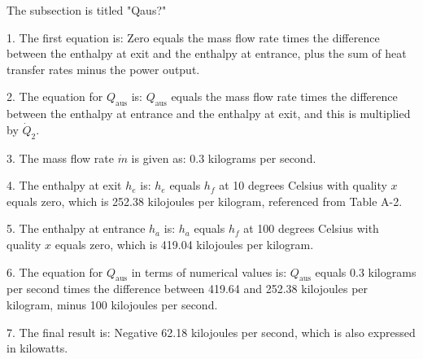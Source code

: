 The subsection is titled "Qaus?"

1. The first equation is:
Zero equals the mass flow rate times the difference between the enthalpy at exit and the enthalpy at entrance, plus the sum of heat transfer rates minus the power output.

2. The equation for \( Q_{\text{aus}} \) is:
\( Q_{\text{aus}} \) equals the mass flow rate times the difference between the enthalpy at entrance and the enthalpy at exit, and this is multiplied by \( \dot{Q}_2 \).

3. The mass flow rate \( \dot{m} \) is given as:
0.3 kilograms per second.

4. The enthalpy at exit \( h_e \) is:
\( h_e \) equals \( h_f \) at 10 degrees Celsius with quality \( x \) equals zero, which is 252.38 kilojoules per kilogram, referenced from Table A-2.

5. The enthalpy at entrance \( h_a \) is:
\( h_a \) equals \( h_f \) at 100 degrees Celsius with quality \( x \) equals zero, which is 419.04 kilojoules per kilogram.

6. The equation for \( Q_{\text{aus}} \) in terms of numerical values is:
\( Q_{\text{aus}} \) equals 0.3 kilograms per second times the difference between 419.64 and 252.38 kilojoules per kilogram, minus 100 kilojoules per second.

7. The final result is:
Negative 62.18 kilojoules per second, which is also expressed in kilowatts.